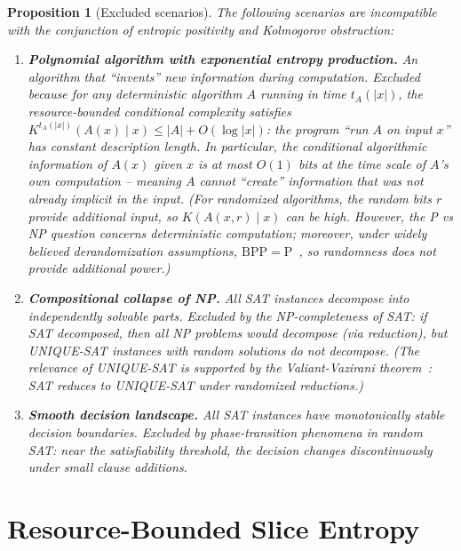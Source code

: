 \documentclass[aps,prd,twocolumn,superscriptaddress,nofootinbib]{revtex4-2}
\newtheorem{proposition}[theorem]{Proposition}
\theoremstyle{definition}
\theoremstyle{remark}
\newcommand{\PP}{\mathrm{P}}
\newcommand{\BPP}{\mathrm{BPP}}
\begin{document}
\begin{proposition}[Excluded scenarios]
\label{prop:excluded}
The following scenarios are incompatible with the conjunction of entropic positivity and Kolmogorov obstruction:

\begin{enumerate}
\item[\textbf{(X1)}] \textbf{Polynomial algorithm with exponential entropy production.} An algorithm that ``invents'' new information during computation. Excluded because for any deterministic algorithm $A$ running in time $t_A(|x|)$, the resource-bounded conditional complexity satisfies $K^{t_A(|x|)}(A(x) \mid x) \leq |A| + O(\log|x|)$: the program ``run $A$ on input $x$'' has constant description length. In particular, the \textit{conditional} algorithmic information of $A(x)$ given $x$ is at most $O(1)$ bits at the time scale of $A$'s own computation -- meaning $A$ cannot ``create'' information that was not already implicit in the input. (For randomized algorithms, the random bits $r$ provide additional input, so $K(A(x,r) \mid x)$ can be high. However, the P vs NP question concerns deterministic computation; moreover, under widely believed derandomization assumptions, $\BPP = \PP$~\cite{ImpagliazzoWigderson1997}, so randomness does not provide additional power.)

\item[\textbf{(X2)}] \textbf{Compositional collapse of NP.} All SAT instances decompose into independently solvable parts. Excluded by the NP-completeness of SAT: if SAT decomposed, then all NP problems would decompose (via reduction), but UNIQUE-SAT instances with random solutions do not decompose. (The relevance of UNIQUE-SAT is supported by the Valiant-Vazirani theorem~\cite{ValiantVazirani1986}: SAT reduces to UNIQUE-SAT under randomized reductions.)

\item[\textbf{(X3)}] \textbf{Smooth decision landscape.} All SAT instances have monotonically stable decision boundaries. Excluded by phase-transition phenomena in random SAT: near the satisfiability threshold, the decision changes discontinuously under small clause additions.
\end{enumerate}
\end{proposition}


\section{Resource-Bounded Slice Entropy}
\label{sec:slices}
\end{document}
